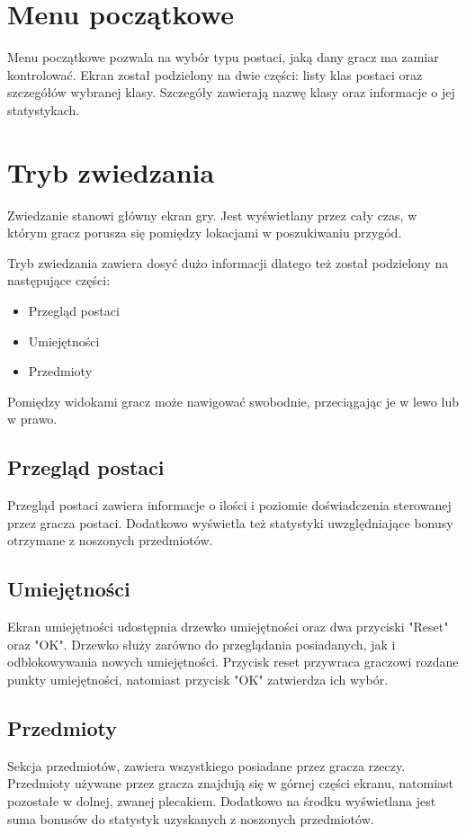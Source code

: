 \documentclass{xmgr}
\begin{document}
\section{Menu początkowe}
Menu początkowe pozwala na wybór typu postaci, jaką dany gracz ma zamiar kontrolować. Ekran został podzielony na dwie części: listy klas postaci oraz szczegółów wybranej klasy. Szczegóły zawierają nazwę klasy oraz informacje o jej statystykach.

\section{Tryb zwiedzania}
Zwiedzanie stanowi główny ekran gry. Jest wyświetlany przez cały czas, w którym gracz porusza się pomiędzy lokacjami w poszukiwaniu przygód. 

Tryb zwiedzania zawiera dosyć dużo informacji dlatego też został podzielony na następujące części: 
\begin{itemize}
	\item Przegląd postaci
	\item Umiejętności
	\item Przedmioty
\end{itemize}
Pomiędzy widokami gracz może nawigować swobodnie, przeciągając je w lewo lub w prawo.
\subsection*{Przegląd postaci}
Przegląd postaci zawiera informacje o ilości i poziomie doświadczenia sterowanej przez gracza postaci. Dodatkowo wyświetla też statystyki uwzględniające bonusy otrzymane z noszonych przedmiotów.
\subsection*{Umiejętności}
Ekran umiejętności udostępnia drzewko umiejętności oraz dwa przyciski "Reset" oraz "OK". Drzewko służy zarówno do przeglądania posiadanych, jak i odblokowywania nowych umiejętności. Przycisk reset przywraca graczowi rozdane punkty umiejętności, natomiast przycisk "OK" zatwierdza ich wybór.
\subsection*{Przedmioty}
Sekcja przedmiotów, zawiera wszystkiego posiadane przez gracza rzeczy. Przedmioty używane przez gracza znajdują się w górnej części ekranu, natomiast pozostałe w dolnej, zwanej plecakiem. Dodatkowo na środku wyświetlana jest suma bonusów do statystyk uzyskanych z noszonych przedmiotów.
\end{document}
